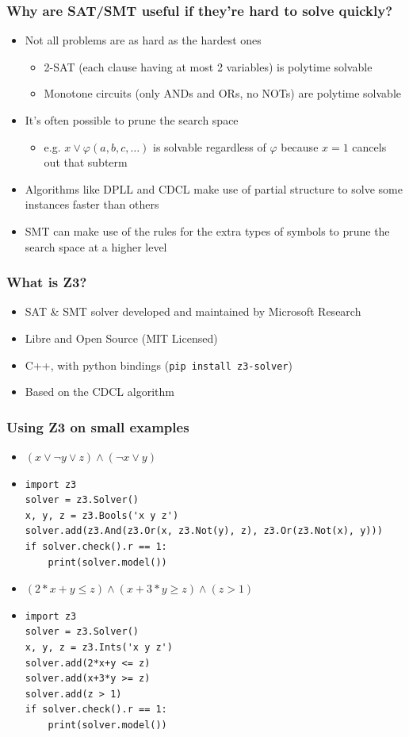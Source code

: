\documentclass[aspectratio=169]{beamer}
\begin{document}
\begin{frame}[fragile]
\frametitle{Why are SAT/SMT useful if they're hard to solve quickly?}
\begin{itemize}
\item Not all problems are as hard as the hardest ones
\begin{itemize}
\item 2-SAT (each clause having at most 2 variables) is polytime solvable
\item Monotone circuits (only ANDs and ORs, no NOTs) are polytime solvable
\end{itemize}
\item It's often possible to prune the search space 
\begin{itemize}
\item e.g. $x \lor \varphi(a, b, c, \hdots)$ is solvable regardless of $\varphi$ because $x=1$ cancels out that subterm
\end{itemize}
\item Algorithms like DPLL and CDCL make use of partial structure to solve some instances faster than others
\item SMT can make use of the rules for the extra types of symbols to prune the search space at a higher level
\end{itemize}
\end{frame}

\begin{frame}[fragile]
\frametitle{What is Z3?}
\begin{itemize}
\item SAT \& SMT solver developed and maintained by Microsoft Research
\item Libre and Open Source (MIT Licensed)
\item C++, with python bindings (\verb|pip install z3-solver|)
\item Based on the CDCL algorithm
\end{itemize}
\end{frame}

\begin{frame}[fragile]
\frametitle{Using Z3 on small examples}
\begin{itemize}
\item $(x \lor \neg y \lor z) \land (\neg x \lor y)$
\item \begin{Verbatim}[fontsize=\scriptsize, frame=single]
import z3
solver = z3.Solver()
x, y, z = z3.Bools('x y z')
solver.add(z3.And(z3.Or(x, z3.Not(y), z), z3.Or(z3.Not(x), y)))
if solver.check().r == 1:
    print(solver.model())
\end{Verbatim}
\item $(2*x+y \le z) \land (x+3*y \ge z) \land (z > 1)$
\item \begin{Verbatim}[fontsize=\scriptsize, frame=single]
import z3
solver = z3.Solver()
x, y, z = z3.Ints('x y z')
solver.add(2*x+y <= z)
solver.add(x+3*y >= z)
solver.add(z > 1)
if solver.check().r == 1:
    print(solver.model())
\end{Verbatim}
\end{itemize}
\end{frame}
\end{document}
